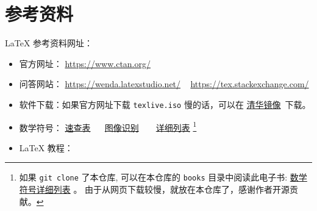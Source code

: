 \documentclass[
    11pt,
    cite=authoryear,
    device=normal,
    lang=cn,
    mode=simple,
    result=answer,
    toc=onecol,
]{elegantbook_sierxue}
\begin{document}
\newpage
\section{参考资料}%
\label{sec:latex-refs}

\LaTeX{} 参考资料网址：
\begin{itemize}
    \item 官方网址： \href{https://www.ctan.org/}{https://www.ctan.org/}
    \item 问答网站：
        \href{https://wenda.latexstudio.net/}{https://wenda.latexstudio.net/}
        ~
        \href{https://tex.stackexchange.com/}{https://tex.stackexchange.com/}
    \item 软件下载：如果官方网址下载 \lstinline{texlive.iso} 慢的话，可以在
    \href{https://mirrors.tuna.tsinghua.edu.cn/CTAN/systems/texlive/Images/}
                {清华镜像}~下载。
    \item 数学符号： \href{books/latex-math-symbols.pdf}{速查表}~ ~
        \href{http://detexify.kirelabs.org/classify.html} {图像识别} ~ ~
        \href{http://mirrors .ustc.edu.cn/CTAN/info/symbols/comprehensive/symbols-a4.pdf}
        {详细列表}
        \footnote{如果 \lstinline{git clone} 了本仓库,
        可以在本仓库的 \lstinline{books}
        目录中阅读此电子书:
        \href{books/symbols-a4.pdf}{数学符号详细列表} 。
        由于从网页下载较慢，就放在本仓库了，感谢作者开源贡献。}
    \item \LaTeX{} 教程：
\end{itemize}
\end{document}
